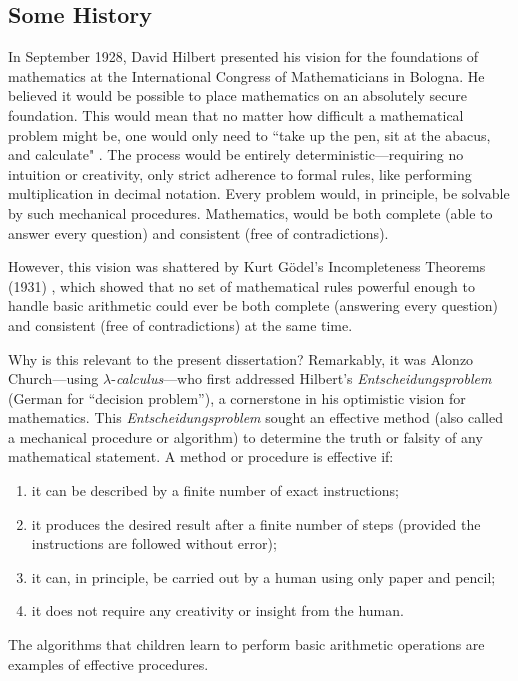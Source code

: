 \subsection*{Some History}

In September 1928, David Hilbert presented his vision for the foundations of mathematics at the International Congress of Mathematicians in Bologna. He believed it would be possible to place mathematics on an absolutely secure foundation. This would mean that no matter how difficult a mathematical problem might be, one would only need to ``take up the pen, sit at the abacus, and calculate" \cite{ferreiraProblemaDecisaoMaquina}. The process would be entirely deterministic—requiring no intuition or creativity, only strict adherence to formal rules, like performing multiplication in decimal notation. Every problem would, in principle, be solvable by such mechanical procedures. Mathematics, would be both complete (able to answer every question) and consistent (free of contradictions). 

However, this vision was shattered by Kurt Gödel’s Incompleteness Theorems (1931) \cite{Godel}, which showed that no set of mathematical rules powerful enough to handle basic arithmetic could ever be both complete (answering every question) and consistent (free of contradictions) at the same time.


Why is this relevant to the present dissertation? Remarkably, it was Alonzo Church—using $\lambda$-\textit{calculus}—who first addressed Hilbert’s \emph{Entscheidungsproblem} (German for ``decision problem''), a cornerstone in his  optimistic vision for mathematics\cite{hilbert1938}. This \emph{Entscheidungsproblem} sought an effective method (also called a mechanical procedure or algorithm) to determine the truth or falsity of any mathematical statement. A method or procedure is effective if:
\begin{enumerate}
    \item it can be described by a finite number of exact instructions;
    \item it produces the desired result after a finite number of steps (provided the instructions are followed without error);
    \item it can, in principle, be carried out by a human using only paper and pencil;
    \item it does not require any creativity or insight from the human.
\end{enumerate}
The algorithms that children learn to perform basic arithmetic operations are examples of effective procedures.

